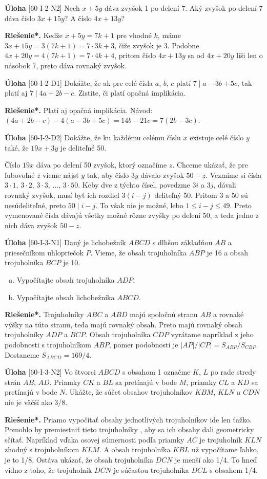 \documentclass{article}
\newcommand{\rieh}{\textbf{Riešenie*.} }
\newcommand{\problem}[3]{
  \begin{tcolorbox}[breakable,notitle,boxrule=0pt,colback=light-gray,colframe=light-gray]
    \textbf{Úloha}
    [#1] #2
  \end{tcolorbox}
  \noindent#3
}
\begin{document}
\problem{60-I-2-N2}{
Nech $x + 5y$ dáva zvyšok 1 po delení 7. Aký zvyšok po delení 7 dáva číslo $3x + 15y$? A číslo $4x + 13y$?
}{
\rieh Keďže $x + 5y = 7k + 1$ pre vhodné $k$, máme $3x + 15y = 3(7k + 1) = 7 \cdot 3k + 3$, čiže zvyšok je 3. Podobne $4x + 20y = 4(7k + 1) = 7 \cdot 4k + 4$, pritom číslo
$4x + 13y$ sa od $4x + 20y$ líši len o násobok 7, preto dáva rovnaký zvyšok.
}


\problem{60-I-2-D1}{
Dokážte, že ak pre celé čísla $a$, $b$, $c$ platí $7 \mid a - 3b + 5c$, tak platí aj $7 \mid 4a + 2b - c$. Zistite, či platí opačná implikácia.
}{
\rieh Platí aj opačná implikácia. Návod: $(4a + 2b - c) - 4(a - 3b + 5c) = 14b - 21c = 7(2b - 3c)$.
}

\problem{60-I-2-D2}{
Dokážte, že ku každému celému číslu $x$ existuje celé číslo $y$ také, že $19x+3y$ je deliteľné 50.
}{
Číslo $19x$ dáva po delení 50 zvyšok, ktorý označíme $z$. Chceme ukázať, že pre
ľubovoľné $z$ vieme nájsť $y$ tak, aby číslo $3y$ dávalo zvyšok $50 - z$. Vezmime si čísla
$3 \cdot 1$, $3 \cdot 2$, $3 \cdot 3$, $\ldots$, $3 \cdot 50$. Keby dve z týchto čísel, povedzme $3i$ a $3j$, dávali rovnaký
zvyšok, musí byť ich rozdiel $3(i - j)$ deliteľný 50. Pritom 3 a 50 sú nesúdeliteľné, preto $50 \mid i - j$. To však nie je možné, lebo $1 \leq  i - j \leq 49$. Preto vymenované čísla dávajú všetky možné rôzne zvyšky po delení 50, a teda jedno z nich dáva zvyšok $50 - z$.
}


\problem{60-I-3-N1}{
Daný je lichobežník $ABCD$ s dlhšou základňou $AB$ a priesečníkom uhlopriečok $P$.
Vieme, že obsah trojuholníka $ABP$ je 16 a obsah trojuholníka $BCP$ je 10.
\begin{enumerate}[a)]
    \item Vypočítajte obsah trojuholníka $ADP$.
    \item Vypočítajte obsah lichobežníka $ABCD$.
\end{enumerate}
}{
\rieh Trojuholníky $ABC$ a $ABD$ majú spoločnú stranu $AB$ a rovnaké výšky na túto stranu, teda majú rovnaký obsah. Preto majú rovnaký obsah trojuholníky $ADP$ a $BCP$. Obsah trojuholníka $CDP$ vyrátame napríklad z jeho podobnosti s trojuholníkom $ABP$, pomer podobnosti je $| AP | / | CP | = S_{ABP}/S_{CBP}$. Dostaneme $S_{ABCD} = 169/4$.
}


\problem{60-I-3-N2}{
Vo štvorci $ABCD$ s obsahom 1 označme $K$, $L$ po rade stredy strán $AB$, $AD$. Priamky $CK$ a $BL$ sa pretínajú v bode $M$, priamky $CL$ a $KD$ sa pretínajú v bode $N$. Ukážte, že súčet obsahov trojuholníkov $KBM$, $KLN$ a $CDN$ nie je väčší ako 3/8.
}{
\rieh Priamo vypočítať obsahy jednotlivých trojuholníkov ide len ťažko. Pomohlo by premiestniť tieto trojuholníky \uv{viac k sebe}, aby sa ich obsahy dali geometricky sčítať. Napríklad vďaka osovej súmernosti podľa priamky $AC$ je trojuholník $KLN$ zhodný s trojuholníkom $KLM$. A obsah trojuholníka $KBL$ už vypočítame ľahko, je to 1/8. Ostáva ukázať, že obsah trojuholníka $DCN$ je menší ako 1/4. To hneď vidno z toho, že trojuholník $DCN$ je súčasťou trojuholníka $DCL$ s obsahom 1/4. 
}
\end{document}
